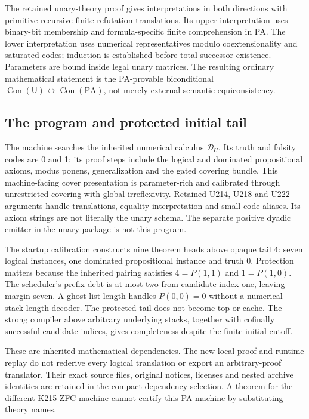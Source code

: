 \documentclass[11pt,letterpaper]{article}
\newcommand{\PA}{\mathrm{PA}}\newcommand{\UU}{\mathsf U}
\newcommand{\Con}{\operatorname{Con}}\newcommand{\Halt}{\operatorname{Halt}}
\begin{document}
The retained unary-theory proof gives interpretations in both directions
with primitive-recursive finite-refutation translations. Its upper
interpretation uses binary-bit membership and formula-specific finite
comprehension in PA. The lower interpretation uses numerical
representatives modulo coextensionality and saturated codes; induction
is established before total successor existence. Parameters are bound
inside legal unary matrices. The resulting ordinary mathematical
statement is the PA-provable biconditional
$\Con(\UU)\leftrightarrow\Con(\PA)$, not merely external semantic
equiconsistency.

\subsection{The program and protected initial tail}
The machine searches the inherited numerical calculus $\mathcal D_U$.
Its truth and falsity codes are 0 and 1; its proof steps include the
logical and dominated propositional axioms, modus ponens,
generalization and the gated covering bundle. This machine-facing
cover presentation is parameter-rich and calibrated through unrestricted
covering with global irreflexivity. Retained U214, U218 and U222 arguments
handle translations, equality interpretation and small-code aliases.
Its axiom strings are not literally the unary schema. The separate
positive dyadic emitter in the unary package is not this program.

The startup calibration constructs nine theorem heads above opaque tail
4: seven logical instances, one dominated propositional instance and
truth 0. Protection matters because the inherited pairing satisfies
$4=P(1,1)$ and $1=P(1,0)$. The scheduler's prefix debt is at most two
from candidate index one, leaving margin seven. A ghost list length
handles $P(0,0)=0$ without a numerical stack-length decoder. The protected
tail does not become top or cache. The strong compiler above arbitrary
underlying stacks, together with cofinally successful candidate indices,
gives completeness despite the finite initial cutoff.

These are inherited mathematical dependencies. The new local proof and
runtime replay do not rederive every logical translation or export an
arbitrary-proof translator. Their exact source files, original notices,
licenses and nested archive identities are retained in the compact
dependency selection. A theorem for the different K215 ZFC machine
cannot certify this PA machine by substituting theory names.
\end{document}
